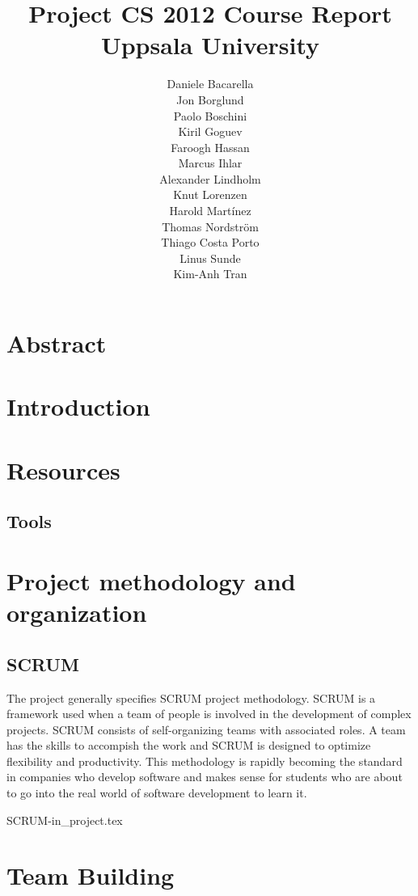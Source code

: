 \documentclass[11pt]{report}
\title{Project CS 2012 Course Report\\Uppsala University\\}
\author{Daniele Bacarella\\
		Jon Borglund\\
		Paolo Boschini\\
		Kiril Goguev\\
		Faroogh Hassan\\
		Marcus Ihlar\\
		Alexander Lindholm\\
		Knut Lorenzen\\
		Harold Mart\'{i}nez\\
		Thomas Nordstr\"om\\
		Thiago Costa Porto\\
		Linus Sunde\\
		Kim-Anh Tran
}
\date{}
\begin{document}
\maketitle

\tableofcontents

\chapter{Abstract}


\chapter{Introduction}

\chapter{Resources}





\section{Tools}




\chapter{Project methodology and organization}
\section{SCRUM}

The project generally specifies SCRUM project methodology. SCRUM is a framework used when a team of people is involved in the development of complex projects. SCRUM consists of self-organizing teams with associated roles. A team has the skills to accompish the work and SCRUM is designed to optimize flexibility and productivity. This methodology is rapidly becoming the standard in companies who develop software and makes sense for students who are about to go into the real world of software development to learn it. 





 {SCRUM-in_project.tex}


\chapter{Team Building}

\end{document}
